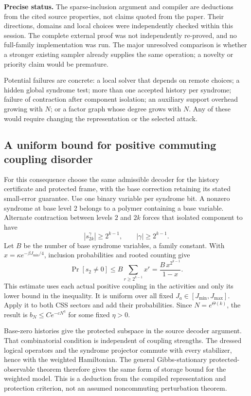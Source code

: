 \documentclass[11pt,a4paper]{article}
\begin{document}
\textbf{Precise status.} The sparse-inclusion argument and compiler are deductions from the cited source properties, not claims quoted from the paper. Their directions, domains and local choices were independently checked within this session. The complete external proof was not independently re-proved, and no full-family implementation was run. The major unresolved comparison is whether a stronger existing sampler already supplies the same operation; a novelty or priority claim would be premature.

Potential failures are concrete: a local solver that depends on remote choices; a hidden global syndrome test; more than one accepted history per syndrome; failure of contraction after component isolation; an auxiliary support overhead growing with $N$; or a factor graph whose degree grows with $N$. Any of these would require changing the representation or the selected attack.

\subsection{A uniform bound for positive commuting coupling disorder}

For this consequence choose the same admissible decoder for the history certificate and protected frame, with the base correction retaining its stated small-error guarantee. Use one binary variable per syndrome bit. A nonzero syndrome at base level 2 belongs to a polymer containing a base variable. Alternate contraction between levels $2$ and $2k$ forces that isolated component to have
\begin{equation}
 |s_{2k}^{\gamma}|\geq 2^{k-1},\qquad |\gamma|\geq2^{k-1}.
\end{equation}
Let $B$ be the number of base syndrome variables, a family constant. With $x=\kappa e^{-\beta J_{\min}/4}$, inclusion probabilities and rooted counting give
\begin{equation}\label{eq:weightedbad}
 \Pr[s_2\ne0]\leq B\sum_{r\geq2^{k-1}}x^r
 =\frac{B\,x^{2^{k-1}}}{1-x}.
\end{equation}
This estimate uses each actual positive coupling in the activities and only its lower bound in the inequality. It is uniform over all fixed $J_a\in[J_{\min},J_{\max}]$. Apply it to both CSS sectors and add their probabilities. Since $N=e^{\Theta(k)}$, the result is $b_N\leq C e^{-cN^\eta}$ for some fixed $\eta>0$.

Base-zero histories give the protected subspace in the source decoder argument. That combinatorial condition is independent of coupling strengths. The dressed logical operators and the syndrome projector commute with every stabilizer, hence with the weighted Hamiltonian. The general Gibbs-stationary protected-observable theorem therefore gives the same form of storage bound for the weighted model.\cite{chesi} This is a deduction from the compiled representation and protection criterion, not an assumed noncommuting perturbation theorem.
\end{document}

